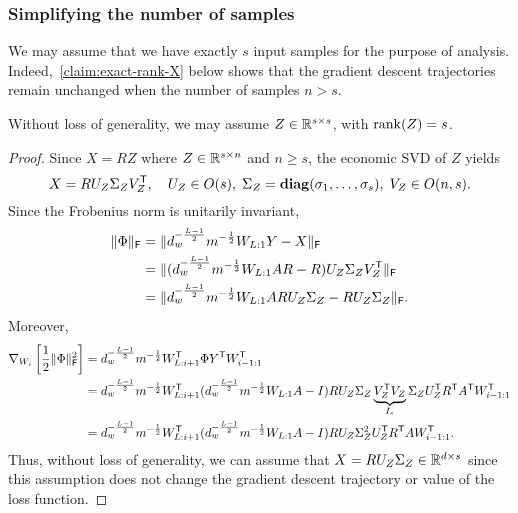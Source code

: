 \subsubsection{Simplifying the number of samples}
\label{sec:subsec:subsubsec:number-of-samples}
We may assume that we have exactly $s$ input samples for the purpose of analysis.
Indeed,~\cref{claim:exact-rank-X} below shows that the gradient descent trajectories remain
unchanged when the number of samples $n > s$.
\begin{claim}
	\label{claim:exact-rank-X}
	Without loss of generality, we may assume $Z \in \mathbb{R}^{s \times s}$, with $\mathrm{rank}(Z) = s$.
\end{claim}
\begin{proof}
	Since $X = RZ$ where $Z \in \mathbb{R}^{s \times n}$ and $n \geq s$, the economic SVD of $Z$ yields
	\[
		X = R U_{Z} \Sigma_{Z} V_{Z}^{\mathsf{T}}, \quad
		U_{Z} \in O(s), \; \Sigma_{Z} = \mathbf{diag}(\sigma_1, \dots, \sigma_{s}),
		\; V_{Z} \in O(n, s).
	\]
	Since the Frobenius norm is unitarily invariant,
	\begin{align*}
		\lVert\Phi\rVert_{\mathsf{F}}
		 & = \lVert d_w^{-\frac{L-1}{2}}m^{-\frac{1}{2}} W_{L:1}Y - X\rVert_{\mathsf{F}}
		\\&= \lVert(d_w^{-\frac{L-1}{2}}m^{-\frac{1}{2}}W_{L:1}AR - R) U_{Z} \Sigma_{Z} V_{Z}^{\mathsf{T}}\rVert_{\mathsf{F}}
		\\&= \lVert d_w^{-\frac{L-1}{2}}m^{-\frac{1}{2}}W_{L:1}ARU_{Z}\Sigma_{Z} - RU_{Z} \Sigma_{Z}\rVert_{\mathsf{F}}.
	\end{align*}
	Moreover,
	\begin{align*}
		\nabla_{W_i} \left[\frac{1}{2}\lVert\Phi\rVert_{\mathsf{F}}^2 \right]
		 & = d_w^{-\frac{L-1}{2}}m^{-\frac{1}{2}} W_{L:i+1}^{\mathsf{T}} \Phi Y^{\mathsf{T}} W_{i-1:1}^{\mathsf{T}}                                                                                                                              \\
		 & = d_w^{-\frac{L-1}{2}}m^{-\frac{1}{2}} W_{L:i+1}^{\mathsf{T}} (d_w^{-\frac{L-1}{2}}m^{-\frac{1}{2}} W_{L:1}A - I)R U_{Z} \Sigma_{Z} \underbrace{V_{Z}^{\mathsf{T}} V_{Z}}_{I_{s}} \Sigma_{Z} U_{Z}^{\mathsf{T}} R^{\mathsf{T}} A^{\mathsf{T}} W_{i-1:1}^{\mathsf{T}} \\
		 & = d_w^{-\frac{L-1}{2}}m^{-\frac{1}{2}} W_{L:i+1}^{\mathsf{T}} (d_w^{-\frac{L-1}{2}}m^{-\frac{1}{2}}  W_{L:1}A - I)R U_{Z} \Sigma_{Z}^2 U_{Z}^{\mathsf{T}} R^{\mathsf{T}} A W_{i-1:1}^{\mathsf{T}}.
	\end{align*}
	Thus, without loss of generality, we can assume that $X = R U_{Z} \Sigma_{Z} \in \mathbb{R}^{d \times s}$ since this assumption does not change the gradient descent trajectory or value of the loss function.
\end{proof}

